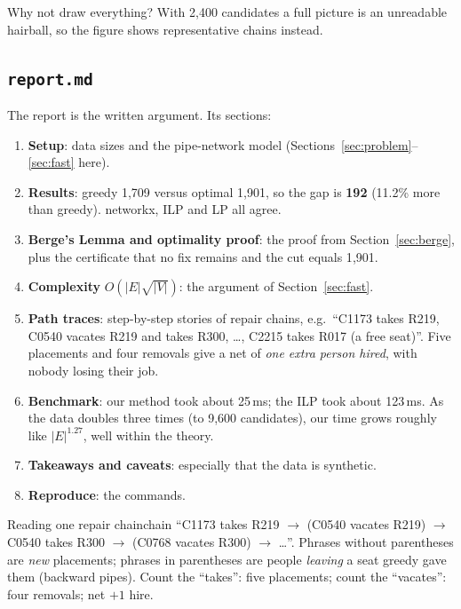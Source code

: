 \documentclass[11pt]{article}
\begin{document}
Why not draw everything? With 2{,}400 candidates a full picture is an unreadable hairball, so the figure shows representative chains instead.

\subsection{\texttt{report.md}}

The report is the written argument. Its sections:
\begin{enumerate}[nosep]
 \item \textbf{Setup}: data sizes and the pipe-network model (Sections~\ref{sec:problem}--\ref{sec:fast} here).
 \item \textbf{Results}: greedy 1{,}709 versus optimal 1{,}901, so the gap is \textbf{192} (11.2\% more than greedy). networkx, ILP and LP all agree.
 \item \textbf{Berge's Lemma and optimality proof}: the proof from Section~\ref{sec:berge}, plus the certificate that no fix remains and the cut equals 1{,}901.
 \item \textbf{Complexity} $O(|E|\sqrt{|V|})$: the argument of Section~\ref{sec:fast}.
 \item \textbf{Path traces}: step-by-step stories of repair chains, e.g.\ ``C1173 takes R219, C0540 vacates R219 and takes R300, \dots, C2215 takes R017 (a free seat)''. Five placements and four removals give a net of \emph{one extra person hired}, with nobody losing their job.
 \item \textbf{Benchmark}: our method took about 25\,ms; the ILP took about 123\,ms. As the data doubles three times (to 9{,}600 candidates), our time grows roughly like $|E|^{1.27}$, well within the theory.
 \item \textbf{Takeaways and caveats}: especially that the data is synthetic.
 \item \textbf{Reproduce}: the commands.
\end{enumerate}

\begin{example}{Reading one repair chain}{chain}
``C1173 takes R219 $\to$ (C0540 vacates R219) $\to$ C0540 takes R300 $\to$ (C0768 vacates R300) $\to$ \dots''. Phrases without parentheses are \emph{new} placements; phrases in parentheses are people \emph{leaving} a seat greedy gave them (backward pipes). Count the ``takes'': five placements; count the ``vacates'': four removals; net $+1$ hire.
\end{example}

\end{document}

